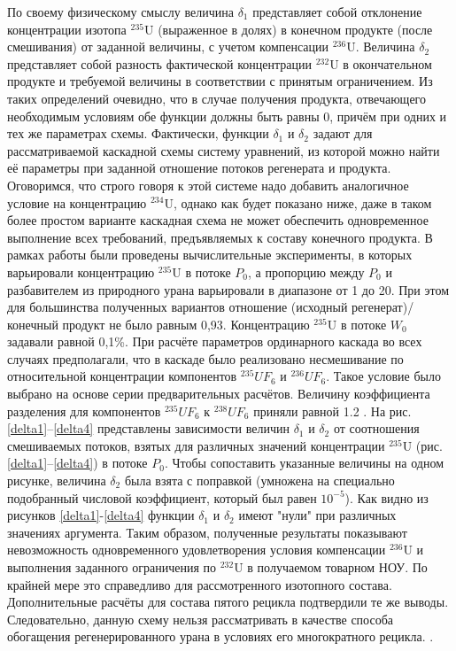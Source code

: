 По своему физическому смыслу величина $\delta_1$ представляет собой отклонение концентрации изотопа $^{235}$U (выраженное в долях) в конечном продукте (после смешивания) от заданной величины, с учетом компенсации $^{236}$U. Величина $\delta_2$ представляет собой разность фактической концентрации $^{232}$U в окончательном продукте и требуемой величины в соответствии с принятым ограничением. Из таких определений очевидно, что в случае получения продукта, отвечающего необходимым условиям обе функции должны быть равны 0, причём при одних и тех же параметрах схемы. Фактически, функции $\delta_1$ и $\delta_2$ задают для рассматриваемой каскадной схемы систему уравнений, из которой можно найти её параметры при заданной отношение потоков регенерата и продукта. Оговоримся, что строго говоря к этой системе надо добавить аналогичное условие на концентрацию $^{234}$U, однако как будет показано ниже, даже в таком более простом варианте каскадная схема не может обеспечить одновременное выполнение всех требований, предъявляемых к составу конечного продукта.   
В рамках работы были проведены вычислительные эксперименты, в которых варьировали концентрацию $^{235}$U в потоке $P_0$, а пропорцию между $P_0$ и разбавителем из природного урана варьировали в диапазоне от 1 до 20. При этом для большинства полученных вариантов отношение (исходный регенерат)/конечный продукт не было равным 0,93. Концентрацию $^{235}$U в потоке $W_0$ задавали равной 0,1\%. При расчёте параметров ординарного каскада во всех случаях предполагали, что в каскаде было реализовано несмешивание по относительной концентрации компонентов $^{235}UF_6$ и $^{236}UF_6$. Такое условие было выбрано на основе серии предварительных расчётов. Величину коэффициента разделения для компонентов  $^{235}UF_6$ к $^{238}UF_6$ приняли равной 1.2  \cite{smirnovEvolutionIsotopicComposition2012}. 
На рис. \ref{delta1}--\ref{delta4} представлены зависимости величин $\delta_1$ и $\delta_2$ от соотношения смешиваемых потоков, взятых для различных значений концентрации $^{235}$U (рис. \ref{delta1}--\ref{delta4}) в потоке $P_0$. Чтобы сопоставить указанные величины на одном рисунке, величина $\delta_2$ была взята с поправкой (умножена на специально подобранный числовой коэффициент, который был равен $10^{-5}$).
Как видно из рисунков \ref{delta1}-\ref{delta4} функции $\delta_1$ и $\delta_2$ имеют "нули" при различных значениях аргумента. Таким образом, полученные результаты показывают невозможность одновременного удовлетворения условия компенсации $^{236}$U и выполнения заданного ограничения по $^{232}$U в получаемом товарном НОУ. По крайней мере это справедливо для рассмотренного изотопного состава. Дополнительные расчёты для состава пятого рецикла подтвердили те же выводы. Следовательно, данную схему нельзя рассматривать в качестве способа обогащения регенерированного урана в условиях его многократного рецикла. .


